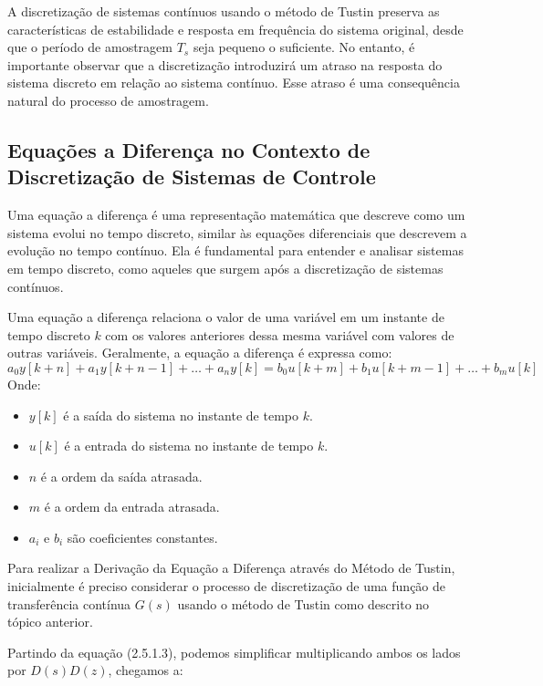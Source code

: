 \documentclass[a4paper,12pt]{article}
\begin{document}
A discretização de sistemas contínuos usando o método de Tustin preserva as características de estabilidade e resposta em frequência do sistema original, desde que o período de amostragem \(T_s\) seja pequeno o suficiente. No entanto, é importante observar que a discretização introduzirá um atraso na resposta do sistema discreto em relação ao sistema contínuo. Esse atraso é uma consequência natural do processo de amostragem.

\subsection{Equações a Diferença no Contexto de Discretização de Sistemas de Controle}

Uma equação a diferença é uma representação matemática que descreve como um sistema evolui no tempo discreto, similar às equações diferenciais que descrevem a evolução no tempo contínuo. Ela é fundamental para entender e analisar sistemas em tempo discreto, como aqueles que surgem após a discretização de sistemas contínuos. 

Uma equação a diferença relaciona o valor de uma variável em um instante de tempo discreto \(k\) com os valores anteriores dessa mesma variável com valores de outras variáveis. Geralmente, a equação a diferença é expressa como:
\begin{equation}
    a_0 y[k + n] + a_1 y[k + n - 1] + \ldots + a_n y[k] = b_0 u[k + m] + b_1 u[k + m - 1] + \ldots + b_m u[k]\tag{2.6.1}
\end{equation}
Onde:
\begin{itemize}
    \item \(y[k]\) é a saída do sistema no instante de tempo \(k\).
    \item \(u[k]\) é a entrada do sistema no instante de tempo \(k\).
    \item \(n\) é a ordem da saída atrasada.
    \item \(m\) é a ordem da entrada atrasada.
    \item \(a_i\) e \(b_i\) são coeficientes constantes.
\end{itemize}

Para realizar a Derivação da Equação a Diferença através do Método de Tustin, inicialmente é preciso considerar o processo de discretização de uma função de transferência contínua \(G(s)\) usando o método de Tustin como descrito no tópico anterior.

Partindo da equação (2.5.1.3), podemos simplificar multiplicando ambos os lados por \(D(s)D(z)\), chegamos a:
\end{document}
